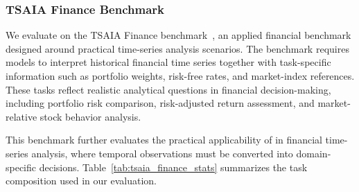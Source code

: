 \subsubsection{TSAIA Finance Benchmark}

We evaluate \method on the TSAIA Finance benchmark~\citep{DBLP:journals/corr/abs-2509-01822}, an applied financial benchmark designed around practical time-series analysis scenarios. The benchmark requires models to interpret historical financial time series together with task-specific information such as portfolio weights, risk-free rates, and market-index references. These tasks reflect realistic analytical questions in financial decision-making, including portfolio risk comparison, risk-adjusted return assessment, and market-relative stock behavior analysis.

This benchmark further evaluates the practical applicability of \method in financial time-series analysis, where temporal observations must be converted into domain-specific decisions. Table~\ref{tab:tsaia_finance_stats} summarizes the task composition used in our evaluation.



